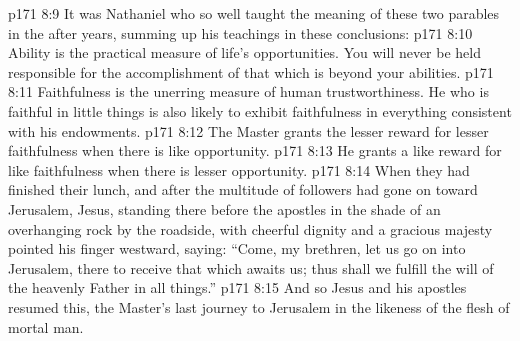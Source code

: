 \vs p171 8:9 It was Nathaniel who so well taught the meaning of these two parables in the after years, summing up his teachings in these conclusions:
\vs p171 8:10 \bibnobreakspace Ability is the practical measure of life’s opportunities. You will never be held responsible for the accomplishment of that which is beyond your abilities.
\vs p171 8:11 \pc {}\bibnobreakspace Faithfulness is the unerring measure of human trustworthiness. He who is faithful in little things is also likely to exhibit faithfulness in everything consistent with his endowments.
\vs p171 8:12 \pc {}\bibnobreakspace The Master grants the lesser reward for lesser faithfulness when there is like opportunity.
\vs p171 8:13 \pc {}\bibnobreakspace He grants a like reward for like faithfulness when there is lesser opportunity.
\vs p171 8:14 \pc When they had finished their lunch, and after the multitude of followers had gone on toward Jerusalem, Jesus, standing there before the apostles in the shade of an overhanging rock by the roadside, with cheerful dignity and a gracious majesty pointed his finger westward, saying: \textcolor{ubdarkred}{“Come, my brethren, let us go on into Jerusalem, there to receive that which awaits us; thus shall we fulfill the will of the heavenly Father in all things.”}
\vs p171 8:15 And so Jesus and his apostles resumed this, the Master’s last journey to Jerusalem in the likeness of the flesh of mortal man.

